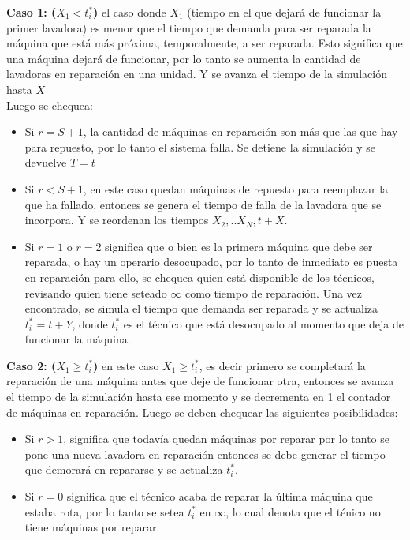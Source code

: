 \documentclass[11pt, spanish, a4paper]{article}
\begin{document}
\textbf{Caso 1: ($X_1 < t^*_i $)} el caso donde $X_1$ (tiempo en el que dejar\'a de funcionar la primer lavadora) es menor que el tiempo que demanda para ser reparada la m\'aquina que est\'a m\'as pr\'oxima, temporalmente, a ser reparada. Esto significa que una m\'aquina dejar\'a de funcionar, por lo tanto se aumenta la cantidad de lavadoras en reparaci\'on en una unidad. Y se avanza el tiempo de la simulaci\'on hasta $X_1$\\
Luego se chequea:
\begin{itemize}
\item Si $r = S+1$, la cantidad de m\'aquinas en reparaci\'on son m\'as que las que hay para repuesto, por lo tanto el sistema falla. Se detiene la simulaci\'on y se devuelve $T = t$
\item Si $r < S+1$, en este caso quedan m\'aquinas de repuesto para reemplazar la que ha fallado, entonces se genera el tiempo de falla de la lavadora que se incorpora. Y se reordenan los tiempos $X_2, .. X_N, t+X$.
\item Si $r = 1$ o $r = 2$ significa que o bien es la primera m\'aquina que debe ser reparada, o hay un operario desocupado, por lo tanto de inmediato es puesta en reparaci\'on para ello, se chequea quien est\'a disponible de los t\'ecnicos, revisando quien tiene seteado $\infty$ como tiempo de reparaci\'on. Una vez encontrado, se simula el tiempo que demanda ser reparada y se actualiza $t^*_i = t+Y$, donde $t^*_i$ es el t\'ecnico que est\'a desocupado al momento que deja de funcionar la m\'aquina.
\end{itemize}

\textbf{Caso 2: ($X_1 \geq t^*_i $)} en este caso $X_1 \geq t^*_i $, es decir primero se completar\'a la reparaci\'on de una m\'aquina antes que deje de funcionar otra, entonces se avanza el tiempo de la simulaci\'on hasta ese momento y se decrementa en 1 el contador de m\'aquinas en reparaci\'on. Luego se deben chequear las siguientes posibilidades:
\begin{itemize}
\item Si $ r > 1 $, significa que todav\'ia quedan m\'aquinas por reparar por lo tanto se pone una nueva lavadora en reparaci\'on entonces se debe generar el tiempo que demorar\'a en repararse y se actualiza $t^*_i$.
\item Si $r = 0$ significa que el t\'ecnico acaba de reparar la \'ultima m\'aquina que estaba rota, por lo tanto se setea $t^*_i$ en $\infty$, lo cual denota que el t\'enico no tiene m\'aquinas por reparar.
\end{itemize} 
\end{document}
